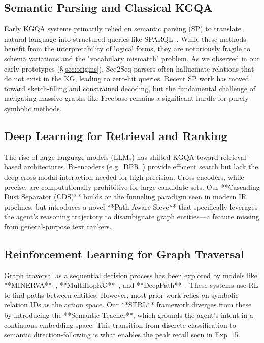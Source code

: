 \documentclass[11pt,a4paper]{article}
\begin{document}
\subsection{Semantic Parsing and Classical KGQA}
Early KGQA systems primarily relied on semantic parsing (SP) to translate
natural language into structured queries like SPARQL~\cite{talmor2018web}.
While these methods benefit from the interpretability of logical forms, they
are notoriously fragile to schema variations and the "vocabulary mismatch"
problem. As we observed in our early prototypes (§\ref{sec:origins}), Seq2Seq
parsers often hallucinate relations that do not exist in the KG, leading to
zero-hit queries. Recent SP work has moved toward sketch-filling and
constrained decoding, but the fundamental challenge of navigating massive
graphs like Freebase remains a significant hurdle for purely symbolic methods.

\subsection{Deep Learning for Retrieval and Ranking}
The rise of large language models (LLMs) has shifted KGQA toward retrieval-based
architectures. Bi-encoders (e.g.\ DPR~\cite{karpukhin2020dense}) provide
efficient search but lack the deep cross-modal interaction needed for high
precision. Cross-encoders, while precise, are computationally prohibitive for
large candidate sets. Our **Cascading Dust Separator (CDS)** builds on the
funneling paradigm seen in modern IR pipelines, but introduces a novel
**Path-Aware Sieve** that specifically leverages the agent's reasoning
trajectory to disambiguate graph entities—a feature missing from general-purpose
text rankers.

\subsection{Reinforcement Learning for Graph Traversal}
Graph traversal as a sequential decision process has been explored by models
like **MINERVA**~\cite{das2017go}, **MultiHopKG**~\cite{lin2018multi}, and
**DeepPath**~\cite{xiong2017deeppath}. These systems use RL to find paths
between entities. However, most prior work relies on symbolic relation IDs as
the action space. Our **STRL** framework diverges from these by introducing the
**Semantic Teacher**, which grounds the agent's intent in a continuous
embedding space. This transition from discrete classification to semantic
direction-following is what enables the peak recall seen in Exp~15.
\end{document}
